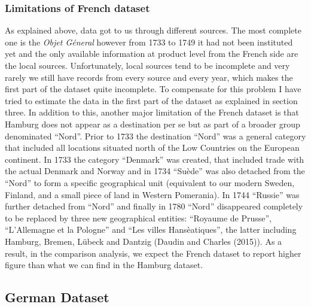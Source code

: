 \documentclass[12pt,a4paper,titlepage]{article}
\begin{document}
\subsubsection{Limitations of French dataset}
As explained above, data got to us through different sources. The most complete one is the \textit{Objet Géneral} however from 1733 to 1749 it had not been instituted yet and the only available information at product level from the French side are the local sources. Unfortunately, local sources tend to be incomplete and very rarely we still have records from every source and every year, which makes the first part of the dataset quite incomplete. To compensate for this problem I have tried to estimate the data in the first part of the dataset as explained in section three.
In addition to this, another major limitation of the French dataset is that Hamburg does not appear as a destination per se but as part of a broader group denominated “Nord”. Prior to 1733 the destination “Nord” was a general category that included all locations situated north of the Low Countries on the European continent. In 1733 the category “Denmark” was created, that included trade with the actual Denmark and Norway and in 1734 “Suède” was also detached from the “Nord” to form a specific geographical unit (equivalent to our modern Sweden, Finland, and a small piece of land in Western Pomerania). In 1744 “Russie” was further detached from “Nord” and finally in 1780 “Nord” disappeared completely to be replaced by three new geographical entities: “Royaume de Prusse”, “L’Allemagne et la Pologne” and “Les villes Hansèatiques”, the latter including Hamburg, Bremen, Lübeck and Dantzig (Daudin and Charles (2015)).
As a result, in the comparison analysis, we expect the French dataset to report higher figure than what we can find in the Hamburg dataset. 

\subsection{German Dataset}
\end{document}

